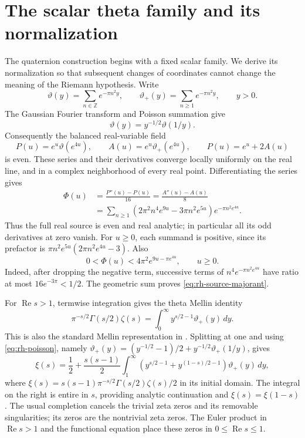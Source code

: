\documentclass[11pt]{article}
\numberwithin{equation}{section}
\theoremstyle{definition}
\theoremstyle{remark}
\begin{document}
\section{The scalar theta family and its normalization}
\label{sec:rh-foundations}

The quaternion construction begins with a fixed scalar family.  We derive
its normalization so that subsequent changes of coordinates cannot change
the meaning of the Riemann hypothesis.  Write
\[
 \vartheta(y)=\sum_{n\in\mathbb Z}e^{-\pi n^2y},\qquad
 \vartheta_+(y)=\sum_{n\ge1}e^{-\pi n^2y},\qquad y>0.
\]
The Gaussian Fourier transform and Poisson summation give
\begin{equation}
 \vartheta(y)=y^{-1/2}\vartheta(1/y).
 \label{eq:rh-poisson}
\end{equation}
Consequently the balanced real-variable field
\[
 P(u)=e^u\vartheta(e^{4u}),\qquad
 A(u)=e^u\vartheta_+(e^{4u}),\qquad P(u)=e^u+2A(u)
\]
is even.  These series and their derivatives converge locally uniformly
on the real line, and in a complex neighborhood of every real point.
Differentiating the series gives
\begin{align}
 \Phi(u)&=\frac{P''(u)-P(u)}{16}
         =\frac{A''(u)-A(u)}8\nonumber\\
 &=\sum_{n\ge1}
 \left(2\pi^2n^4e^{9u}-3\pi n^2e^{5u}\right)
 e^{-\pi n^2e^{4u}}.
 \label{eq:rh-theta-source}
\end{align}
Thus the full real source is even and real analytic; in particular all
its odd derivatives at zero vanish.  For $u\ge0$, each summand is
positive, since its prefactor is
$\pi n^2e^{5u}(2\pi n^2e^{4u}-3)$.  Also
\begin{equation}
 0<\Phi(u)<4\pi^2e^{9u-\pi e^{4u}},\qquad u\ge0.
 \label{eq:rh-source-majorant}
\end{equation}
Indeed, after dropping the negative term, successive terms of
$n^4e^{-\pi n^2e^{4u}}$ have ratio at most $16e^{-3\pi}<1/2$.
The geometric sum proves \eqref{eq:rh-source-majorant}.

For $\operatorname{Re}s>1$, termwise integration gives the theta Mellin
identity
\[
 \pi^{-s/2}\Gamma(s/2)\zeta(s)
 =\int_0^\infty y^{s/2-1}\vartheta_+(y)\,dy.
\]
This is also the standard Mellin representation in \cite{dlmf}.
Splitting at one and using \eqref{eq:rh-poisson}, namely
$\vartheta_+(y)=(y^{-1/2}-1)/2+y^{-1/2}\vartheta_+(1/y)$,
gives
\begin{equation}
 \xi(s)=\frac12+\frac{s(s-1)}2
 \int_1^\infty
 \left(y^{s/2-1}+y^{(1-s)/2-1}\right)\vartheta_+(y)\,dy,
 \label{eq:rh-xi-mellin}
\end{equation}
where $\xi(s)=s(s-1)\pi^{-s/2}\Gamma(s/2)\zeta(s)/2$ in its
initial domain.  The integral on the right is entire in $s$, providing
analytic continuation and $\xi(s)=\xi(1-s)$.  The usual completion
cancels the trivial zeta zeros and its removable singularities; its
zeros are the nontrivial zeta zeros.  The Euler product in
$\operatorname{Re}s>1$ and the functional equation place these zeros
in $0\le\operatorname{Re}s\le1$.
\end{document}

